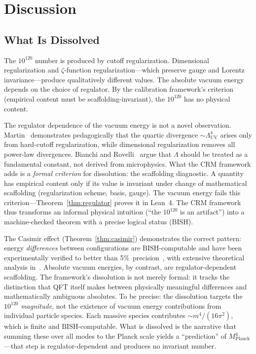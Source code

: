 \documentclass[11pt,a4paper]{article}
\theoremstyle{plain}
\theoremstyle{definition}
\newcommand{\BISH}{\ensuremath{\mathrm{BISH}}}
\newcommand{\MPl}{M_{\mathrm{Planck}}}
\begin{document}
\section{Discussion}\label{sec:discussion}

\subsection{What Is Dissolved}

The $10^{120}$ number is produced by cutoff regularization.
Dimensional regularization and $\zeta$-function regularization---which
preserve gauge and Lorentz invariance---produce qualitatively
different values.  The absolute vacuum energy depends on the choice
of regulator.  By the calibration framework's criterion
(empirical content must be scaffolding-invariant), the $10^{120}$
has no physical content.

The regulator dependence of the vacuum energy is not a novel
observation.  Martin~\cite{Martin2012} demonstrates pedagogically
that the quartic divergence $\sim \Lambda_{\mathrm{UV}}^4$ arises
only from hard-cutoff regularization, while dimensional
regularization removes all power-law divergences.  Bianchi and
Rovelli~\cite{BianchiRovelli2010} argue that $\Lambda$ should be
treated as a fundamental constant, not derived from microphysics.
What the CRM framework adds is a \emph{formal criterion} for
dissolution: the scaffolding diagnostic.  A quantity has empirical
content only if its value is invariant under change of mathematical
scaffolding (regularization scheme, basis, gauge).  The vacuum
energy fails this criterion---Theorem~\ref{thm:regulator} proves
it in Lean~4.  The CRM framework thus transforms an informal
physical intuition (``the $10^{120}$ is an artifact'') into a
machine-checked theorem with a precise logical status ($\BISH$).

The Casimir effect (Theorem~\ref{thm:casimir}) demonstrates the
correct pattern: energy \emph{differences} between configurations
are $\BISH$-computable and have been experimentally verified to
better than 5\%~precision~\cite{Lamoreaux1997}, with extensive
theoretical analysis in~\cite{Bordag2001,Casimir1948}.  Absolute
vacuum energies, by contrast, are regulator-dependent scaffolding.
The framework's dissolution is not merely formal: it tracks the
distinction that QFT itself makes between physically meaningful
differences and mathematically ambiguous absolutes.
To be precise: the dissolution targets the $10^{120}$ \emph{magnitude},
not the existence of vacuum energy contributions from individual
particle species.  Each massive species contributes $\sim m^4/(16\pi^2)$,
which is finite and $\BISH$-computable.  What is dissolved is the
narrative that summing these over all modes to the Planck scale
yields a ``prediction'' of $\MPl^4$---that step is
regulator-dependent and produces no invariant number.
\end{document}
